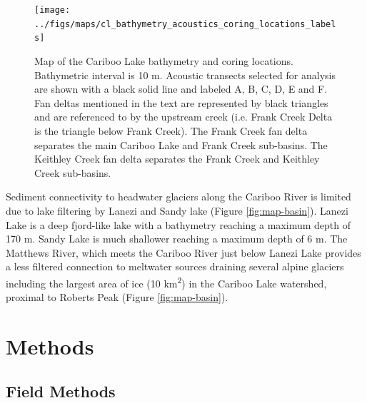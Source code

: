 \documentclass[Royal,times,doublespace,sageh]{sagej}
\begin{document}
\begin{figure}

{\centering \texttt{[image: ../figs/maps/cl\_bathymetry\_acoustics\_coring\_locations\_labels]} 

}

\caption{Map of the Cariboo Lake bathymetry and coring locations. Bathymetric interval is 10 m. Acoustic transects selected for analysis are shown with a black solid line and labeled A, B, C, D, E and F. Fan deltas mentioned in the text are represented by black triangles and are referenced to by the upstream creek (i.e. Frank Creek Delta is the triangle below Frank Creek). The Frank Creek fan delta separates the main Cariboo Lake and Frank Creek sub-basins. The Keithley Creek fan delta separates the Frank Creek and Keithley Creek sub-basins.\label{fig:map-lake}}\label{fig:map-lake}
\end{figure}

Sediment connectivity to headwater glaciers along the Cariboo River is
limited due to lake filtering by Lanezi and Sandy lake (Figure
\ref{fig:map-basin}). Lanezi Lake is a deep fjord-like lake with a
bathymetry reaching a maximum depth of 170 m. Sandy Lake is much
shallower reaching a maximum depth of 6 m. The Matthews River, which
meets the Cariboo River just below Lanezi Lake provides a less filtered
connection to meltwater sources draining several alpine glaciers
including the largest area of ice (10 km\textsuperscript{2}) in the
Cariboo Lake watershed, proximal to Roberts Peak (Figure
\ref{fig:map-basin}).

\hypertarget{methods}{%
\section{Methods}\label{methods}}

\hypertarget{field-methods}{%
\subsection{Field Methods}\label{field-methods}}
\end{document}
